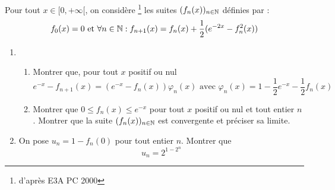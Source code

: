 Pour tout $x \in [0,+\infty[$, on consid{\`e}re \footnote{d'apr{\`e}s E3A PC 2000} les suites $(f_n(x))_{n\in \mathbb{N}}$ d{\'e}finies par :
\begin{displaymath}
f_0(x)=0 \text{ et }
\forall n \in \mathbb{N} :
f_{n+1}(x) = f_n(x)+\frac{1}{2}(e^{-2x}-f_n^2(x))  
\end{displaymath}

\begin{enumerate}
  \item
    \begin{enumerate}
      \item Montrer que, pour tout $x$ positif ou nul
\begin{displaymath}
e^{-x}-f_{n+1}(x)=(e^{-x}-f_n(x))\varphi_n(x) \text{ avec } \varphi_n(x)=1-\frac{1}{2}e^{-x}-\frac{1}{2}f_n(x) 
\end{displaymath}
      \item Montrer que $0\leq f_n(x)\leq e^{-x}$ pour tout $x$ positif ou nul et tout entier $n$.  Montrer que la suite $(f_n(x))_{n\in \mathbb{N}}$ est convergente et préciser sa limite.
    \end{enumerate}

  \item On pose $u_n=1-f_n(0)$ pour tout entier $n$. Montrer que
  \[u_n=2^{1-2^n}\]
\end{enumerate}
